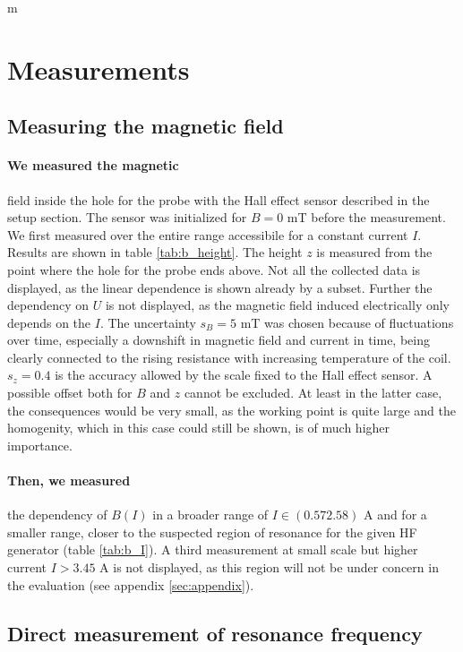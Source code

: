 m\section{Measurements}

\subsection{Measuring the magnetic field}
\paragraph{We measured the magnetic} 
field inside the hole for the probe with the Hall effect sensor described in the setup section. 
The sensor was initialized for $B = 0$ mT before the measurement. We first measured over the 
entire range accessibile for a constant current $I$. Results are shown in table \ref{tab:b_height}. 
The height $z$ is measured from the point where the hole for the probe ends above. 
Not all the collected data is displayed, as the linear dependence is shown already by a subset. Further 
the dependency on $U$ is not displayed, as the magnetic field induced electrically only depends on the 
$I$. The uncertainty $s_B = 5$ mT was chosen because of fluctuations over time, especially a 
downshift in magnetic field and current in time, being clearly connected to the rising resistance with 
increasing temperature of the coil. $s_z = 0.4$ is the accuracy allowed by the scale fixed to the 
Hall effect sensor. A possible offset both for $B$ and $z$ cannot be excluded. At least in the latter case, 
the consequences would be very small, as the working point is quite large and the homogenity, which 
in this case could still be shown, is of much higher importance. 

 
\paragraph{Then, we measured} 
the dependency of $B(I)$ in a broader range of $I \in (0.57 2.58)$ A 
and for a smaller range, closer to the suspected region of resonance 
for the given HF generator (table \ref{tab:b_I}). A third measurement at small scale 
but higher current $I > 3.45$ A is not displayed, as this region will not be under 
concern in the evaluation (see appendix \ref{sec:appendix}). 

\FloatBarrier

\subsection{Direct measurement of resonance frequency}
